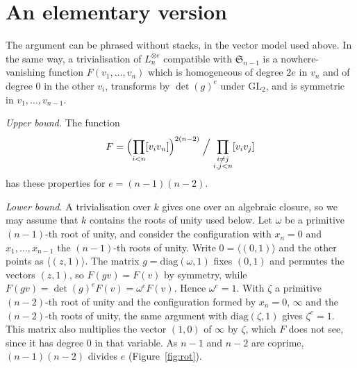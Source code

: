 \documentclass[11pt,a4paper]{amsart}
\theoremstyle{remark}
\newcommand{\Sn}{\mathfrak S}
\begin{document}
\section{An elementary version}

The argument can be phrased without stacks, in the vector model used above. In the same way, a trivialisation of $L_n^{\otimes e}$ compatible with $\Sn_{n-1}$ is a nowhere-vanishing function $F(v_1, \dots, v_n)$ which is homogeneous of degree $2e$ in $v_n$ and of degree $0$ in the other $v_i$, transforms by $\det(g)^e$ under $\mathrm{GL}_2$, and is symmetric in $v_1, \dots, v_{n-1}$.

\emph{Upper bound.} The function
\[
F = \Bigl(\prod_{i<n}[v_iv_n]\Bigr)^{2(n-2)} \Bigm/ \prod_{\substack{i \ne j\\ i,j<n}}[v_iv_j]
\]
has these properties for $e = (n-1)(n-2)$.

\emph{Lower bound.} A trivialisation over $k$ gives one over an algebraic closure, so we may assume that $k$ contains the roots of unity used below. Let $\omega$ be a primitive $(n-1)$-th root of unity, and consider the configuration with $x_n = 0$ and $x_1, \dots, x_{n-1}$ the $(n-1)$-th roots of unity. Write $0 = \langle(0,1)\rangle$ and the other points as $\langle(z,1)\rangle$. The matrix $g = \mathrm{diag}(\omega, 1)$ fixes $(0,1)$ and permutes the vectors $(z,1)$, so $F(gv) = F(v)$ by symmetry, while $F(gv) = \det(g)^e F(v) = \omega^e F(v)$. Hence $\omega^e = 1$. With $\zeta$ a primitive $(n-2)$-th root of unity and the configuration formed by $x_n = 0$, $\infty$ and the $(n-2)$-th roots of unity, the same argument with $\mathrm{diag}(\zeta, 1)$ gives $\zeta^e = 1$. This matrix also multiplies the vector $(1,0)$ of $\infty$ by $\zeta$, which $F$ does not see, since it has degree $0$ in that variable. As $n - 1$ and $n - 2$ are coprime, $(n-1)(n-2)$ divides $e$ (Figure~\ref{fig:rot}).
\end{document}
